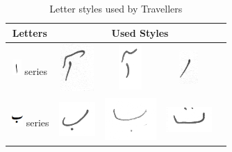 \documentclass[a4paper,conference]{IEEEtran}
\begin{document}
\begin{table}[h]
\centering
\caption{Letter styles used by Travellers}\label{tab6-trav}
\begin{tabular}{@{}ccccc@{}}
\hline
Letters	& \multicolumn{4}{c}{\textbf{Used Styles}} \\ \hline
\includegraphics[scale=0.50]{alif.png} series & \includegraphics[scale=0.20]{40} & \includegraphics[scale=0.20]{41}  & \includegraphics[scale=0.35]{42}  & \\ 
\hline
\includegraphics[scale=0.50]{bay} series & \includegraphics[scale=0.20]{43} & \includegraphics[scale=0.20]{44}  & \includegraphics[scale=0.20]{45} & \\
\hline

\end{tabular}
\end{table}
\end{document}

